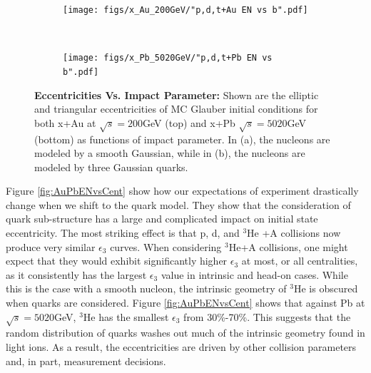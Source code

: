 \documentclass[twocolumn,showpacs,amsfonts,aps,prc,nofootinbib,floatfix]{revtex4}
\begin{document}
\begin{figure}[h]
	\begin{subfigure}{0.8\linewidth}
		\centering
		\texttt{[image: figs/x\_Au\_200GeV/"p,d,t+Au EN vs b".pdf]}
		\label{subfig:AuENvsB}
	\end{subfigure}\\
	\begin{subfigure}{0.8\linewidth}
		\texttt{[image: figs/x\_Pb\_5020GeV/"p,d,t+Pb EN vs b".pdf]}
		\label{subfig:PbENvsB}
	\end{subfigure}
    \caption{\textbf{Eccentricities Vs. Impact Parameter:}  Shown are the elliptic and triangular eccentricities of MC Glauber initial conditions for both x+Au at $\sqrt{s}=200$GeV (top) and x+Pb $\sqrt{s}=5020$GeV (bottom) as functions of impact parameter. In (a), the nucleons are modeled by a smooth Gaussian, while in (b), the nucleons are modeled by three Gaussian quarks.}
    \label{fig:AuPbENvsB}
\end{figure}
Figure \ref{fig:AuPbENvsCent} show how our expectations of experiment drastically change when we shift to the quark model. They show that the consideration of quark sub-structure has a large and complicated impact on initial state eccentricity. The most striking effect is that p, d, and $^3$He +A collisions now produce very similar $\epsilon_3$ curves. When considering $^3$He+A collisions, one might expect that they would exhibit significantly higher $\epsilon_3$ at most, or all centralities, as it consistently has the largest $\epsilon_3$ value in intrinsic and head-on cases. While this is the case with a smooth nucleon, the intrinsic geometry of $^3$He is obscured when quarks are considered. Figure \ref{fig:AuPbENvsCent} shows that against Pb at $\sqrt{s}=5020$GeV, $^3$He has the smallest $\epsilon_3$ from 30\%-70\%. This suggests that the random distribution of quarks washes out much of the intrinsic geometry found in light ions. As a result, the eccentricities are driven by other collision parameters and, in part, measurement decisions.
\end{document}
